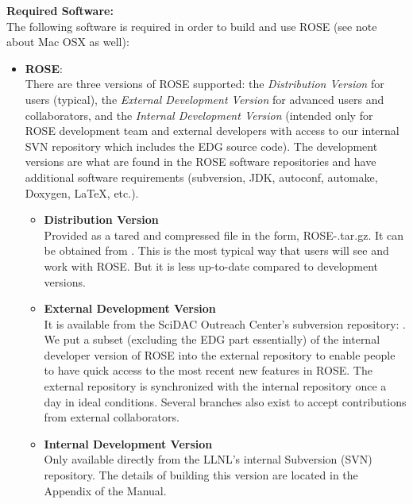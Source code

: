 {\bf Required Software:} \\
  The following software is required in order to build and use ROSE 
(see note about Mac OSX as well):
\begin{itemize}
   \item {\bf ROSE}: \\
     There are three versions of ROSE supported: the {\it Distribution Version} for users
    (typical), the {\it External Development Version} for advanced users and collaborators, 
     and the {\it Internal Development Version} (intended only for ROSE development team
     and external developers with access to our internal SVN repository which includes the
     EDG source code). The development versions are what are found in the ROSE software
     repositories and have additional software requirements (subversion, JDK, autoconf,
     automake, Doxygen, LaTeX, etc.).
     \begin{itemize}
       \item {\bf Distribution Version} \\
       Provided as a tared and compressed file in the form, ROSE-\VersionNumber.tar.gz.
       It can be obtained from . 
       This is the most typical way that users will see and work with ROSE. But it is less
       up-to-date compared to development versions.

       \item {\bf External Development Version } \\
       It is available from the SciDAC Outreach Center's subversion repository:
       .
       We put a subset (excluding the EDG part essentially) of the internal developer version of
       ROSE into the external repository to enable people to have quick access to the most
       recent new features in ROSE.  The external repository is synchronized with the
       internal repository once a day in ideal conditions. Several branches also exist to
       accept contributions from external collaborators.

       \item {\bf Internal Development Version} \\
       Only available directly from the LLNL's internal Subversion (SVN) repository. 
       The details of building this version are located in the Appendix of the Manual. %
     \end{itemize}


\end{itemize}
